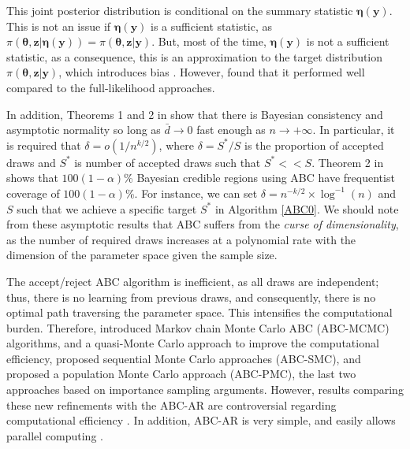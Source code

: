 This joint posterior distribution is conditional on the summary statistic $\boldsymbol\eta(\boldsymbol y)$. This is not an issue if $\boldsymbol\eta(\boldsymbol y)$ is a sufficient statistic, as $\pi(\boldsymbol\theta,\boldsymbol z|\boldsymbol\eta(\boldsymbol y))=\pi(\boldsymbol\theta,\boldsymbol z|\boldsymbol y)$. But, most of the time, $\boldsymbol\eta(\boldsymbol y)$ is not a sufficient statistic, as a consequence, this is an approximation to the target distribution $\pi(\boldsymbol\theta,\boldsymbol z|\boldsymbol y)$, which introduces bias \cite{blum2010approximate}. However, \cite{beaumont2002approximate} found that it performed well compared to the full-likelihood approaches.

In addition, Theorems 1 and 2 in \cite{frazier2018asymptotic} show that there is Bayesian consistency and asymptotic normality so long as $\bar{d}\rightarrow 0$ fast enough as $n\rightarrow +\infty$. In particular, it is required that $\delta=o(1/n^{k / 2})$, where $\delta=S^*/S$ is the proportion of accepted draws and $S^*$ is number of accepted draws such that $S^*<<S$. Theorem 2 in \cite{frazier2018asymptotic} shows that $100(1 -\alpha)$\% Bayesian credible regions using ABC have frequentist coverage of $100(1 -\alpha)$\%. For instance, we can set $\delta=n^{-k/2}\times\log^{-1}(n)$ and $S$ such that we achieve a specific target $S^*$ in Algorithm \ref{ABC0}. We should note from these asymptotic results that ABC suffers from the \textit{curse of dimensionality}, as the number of required draws increases at a polynomial rate with the dimension of the parameter space given the sample size.

The accept/reject ABC algorithm is inefficient, as all draws are independent; thus, there is no learning from previous draws, and consequently, there is no optimal path traversing the parameter space.
This intensifies the computational burden.
Therefore, \cite{marjoram2003markov,wegmann2009efficient} introduced Markov chain Monte Carlo ABC (ABC-MCMC) algorithms, and \cite{buchholz2019improving} a quasi-Monte Carlo approach to improve the computational efficiency, \cite{sisson2007sequential,drovandi2011estimation,del2012adaptive,lenormand2013adaptive} proposed sequential Monte Carlo approaches (ABC-SMC), and \cite{Beaumont2009adaptivity} proposed a population Monte Carlo approach (ABC-PMC), the last two approaches based on importance sampling arguments.
However, results comparing these new refinements with the ABC-AR are controversial regarding computational efficiency \cite{bertorelle2010abc}.
In addition, ABC-AR is very simple, and easily allows parallel computing \cite{frazier2019approximate}. %

